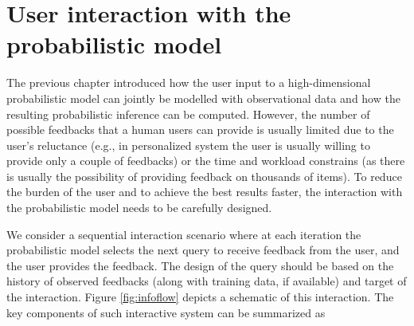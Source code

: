 \documentclass[dissertation,math,vertlayout,pdfa,colorlinks]{aaltoseries}
\begin{document}
	
 









\chapter{User interaction with the probabilistic model}\label{interaction}


 
The previous chapter introduced how the user input to a high-dimensional probabilistic model can jointly be modelled with observational data and how the resulting probabilistic inference can be computed. However, the number of possible feedbacks that a human users can provide is usually limited due to the user's reluctance (e.g., in personalized system the user is usually willing to provide only a couple of feedbacks) or the time and workload constrains (as there is usually the possibility of providing feedback on thousands of items). To reduce the burden of the user and to achieve the best results faster, the interaction with the probabilistic model needs to be carefully designed. 

We consider a sequential interaction scenario where at each iteration the probabilistic model selects the next query to receive feedback from the user, and the user provides the feedback. The design of the query should be based on the history of observed feedbacks (along with training data, if available) and target of the interaction. Figure \ref{fig:infoflow} depicts a schematic of this interaction. The key components of such interactive system can be summarized as
\end{document}
